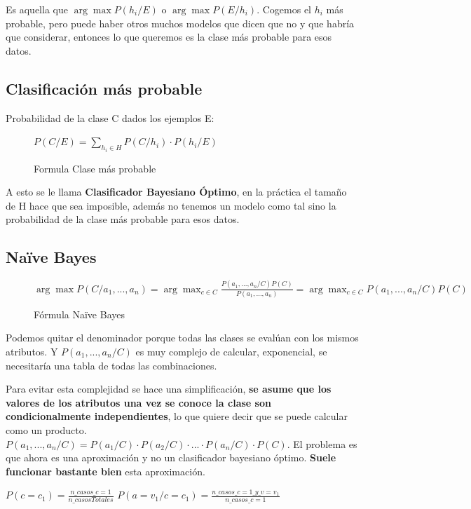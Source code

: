 \documentclass[12pt, twoside, openright]{report} %
\begin{document}
Es aquella que \(\arg \max P(h_i/E)\) o $\arg \max P(E/h_i) $.
Cogemos el \(h_i\) más probable, pero puede haber otros muchos modelos
que dicen que no y que habría que considerar, entonces lo que queremos
es la clase más probable para esos datos.

\subsection{Clasificación más
	probable}

Probabilidad de la clase C dados los ejemplos E:
\begin{figure}[H]
	\(P(C/E) = \sum _{h_i \in H} P(C/h_i) \cdot P(h_i/E)\)
	\captionsetup{justification=centering}
	\caption{Formula Clase más probable}
\end{figure}

A esto se le llama \textbf{Clasificador Bayesiano Óptimo}, en la práctica el tamaño de H hace que sea imposible, además no tenemos un modelo como tal sino la probabilidad de la clase más probable para esos datos.

\subsection{Naïve Bayes}

\begin{figure}[H]
	\(\arg \max P(C/a_1, ...,a_n)= \arg \max _{c \in C} \frac {P(a_1, ...,a_n/C)P(C)}{P(a_1, ...,a_n)}=\arg \max_{c \in C} P(a_1, ...,a_n/C)P(C)\)
	\captionsetup{justification=centering}
	\caption{Fórmula Naïve Bayes}
\end{figure}

Podemos quitar el denominador porque todas las clases se evalúan con los
mismos atributos. Y \(P(a_1, ...,a_n/C)\) es muy complejo de calcular,
exponencial, se necesitaría una tabla de todas las combinaciones.

Para evitar esta complejidad se hace una simplificación, \textbf{se asume que los valores de los atributos una vez se conoce la clase son
	condicionalmente independientes}, lo que quiere decir que se puede
calcular como un producto.
\(P(a_1, ...,a_n/C) = P(a_1/C) \cdot P(a_2/C) \cdot ... \cdot P(a_n/C) \cdot P(C)\).
El problema es que ahora es una aproximación y no un clasificador
bayesiano óptimo. \textbf{Suele funcionar bastante bien} esta
aproximación.

\(P(c=c_1)= \frac {n\_casos\_c=1}{n\_casosTotales}\)
\(P(a=v_1/c=c_1)= \frac {n\_casos\_c=1\_y\_v=v_1}{n\_casos\_c=1}\)
\end{document}
